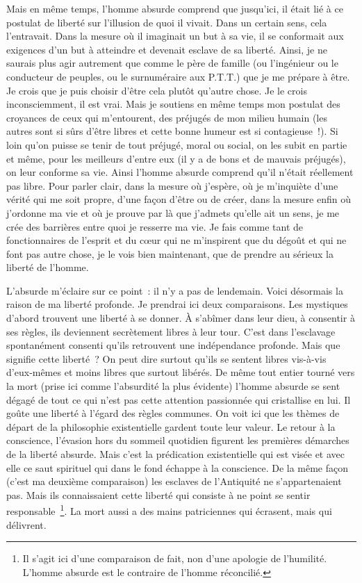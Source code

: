 \documentclass{book}
\begin{document}
Mais en même temps, l'homme absurde comprend que jusqu'ici, il était lié à ce postulat de liberté sur l'illusion de quoi il vivait. Dans un certain sens, cela l'entravait. Dans la mesure où il imaginait un but à sa vie, il se conformait aux exigences d'un but à atteindre et devenait esclave de sa liberté. Ainsi, je ne saurais plus agir autrement que comme le père de famille (ou l'ingénieur ou le conducteur de peuples, ou le surnuméraire aux P.T.T.) que je me prépare à être. Je crois que je puis choisir d'être cela plutôt qu'autre chose. Je le crois inconsciemment, il est vrai. Mais je soutiens en même temps mon postulat des croyances de ceux qui m'entourent, des préjugés de mon milieu humain (les autres sont si sûrs d'être libres et cette bonne humeur est si contagieuse !). Si loin qu'on puisse se tenir de tout préjugé, moral ou social, on les subit en partie et même, pour les meilleurs d'entre eux (il y a de bons et de mauvais préjugés), on leur conforme sa vie. Ainsi l'homme absurde comprend qu'il n'était réellement pas libre. Pour parler clair, dans la mesure où j'espère, où je m'inquiète d'une vérité qui me soit propre, d'une façon d'être ou de créer, dans la mesure enfin où j'ordonne ma vie et où je prouve par là que j'admets qu'elle ait un sens, je me crée des barrières entre quoi je resserre ma vie. Je fais comme tant de fonctionnaires de l'esprit et du cœur qui ne m'inspirent que du dégoût et qui ne font pas autre chose, je le vois bien maintenant, que de prendre au sérieux la liberté de l'homme.

L'absurde m'éclaire sur ce point : il n'y a pas de lendemain. Voici désormais la raison de ma liberté profonde. Je prendrai ici deux comparaisons. Les mystiques d'abord trouvent une liberté à se donner. À s'abîmer dans leur dieu, à consentir à ses règles, ils deviennent secrètement libres à leur tour. C'est dans l'esclavage spontanément consenti qu'ils retrouvent une indépendance profonde. Mais que signifie cette liberté ? On peut dire surtout qu'ils se sentent libres vis-à-vis d'eux‑mêmes et moins libres que surtout libérés. De même tout entier tourné vers la mort (prise ici comme l'absurdité la plus évidente) l'homme absurde se sent dégagé de tout ce qui n'est pas cette attention passionnée qui cristallise en lui. Il goûte une liberté à l'égard des règles communes. On voit ici que les thèmes de départ de la philosophie existentielle gardent toute leur valeur. Le retour à la conscience, l'évasion hors du sommeil quotidien figurent les premières démarches de la liberté absurde. Mais c'est la prédication existentielle qui est visée et avec elle ce saut spirituel qui dans le fond échappe à la conscience. De la même façon (c'est ma deuxième comparaison) les esclaves de l'Antiquité ne s'appartenaient pas. Mais ils connaissaient cette liberté qui consiste à ne point se sentir responsable \footnote{Il s’agit ici d’une comparaison de fait, non d’une apologie de l’humilité. L’homme absurde est le contraire de l’homme réconcilié.}. La mort aussi a des mains patriciennes qui écrasent, mais qui délivrent.
\end{document}
